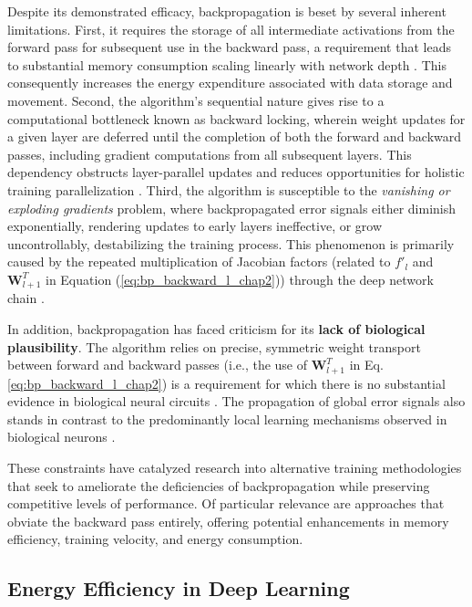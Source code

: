 Despite its demonstrated efficacy, backpropagation is beset by several inherent limitations. First, it requires the storage of all intermediate activations from the forward pass for subsequent use in the backward pass, a requirement that leads to substantial memory consumption scaling linearly with network depth \cite{chen2016training}. This consequently increases the energy expenditure associated with data storage and movement. Second, the algorithm's sequential nature gives rise to a computational bottleneck known as backward locking, wherein weight updates for a given layer are deferred until the completion of both the forward and backward passes, including gradient computations from all subsequent layers. This dependency obstructs layer-parallel updates and reduces opportunities for holistic training parallelization \cite{jaderberg2017decoupled}. Third, the algorithm is susceptible to the \emph{vanishing or exploding gradients} problem, where backpropagated error signals either diminish exponentially, rendering updates to early layers ineffective, or grow uncontrollably, destabilizing the training process. This phenomenon is primarily caused by the repeated multiplication of Jacobian factors (related to $f'_l$ and $\mathbf{W}_{l+1}^T$ in Equation (\ref{eq:bp_backward_l_chap2})) through the deep network chain \cite{hochreiter2001gradient}.

In addition, backpropagation has faced criticism for its \textbf{lack of biological plausibility}. The algorithm relies on precise, symmetric weight transport between forward and backward passes (i.e., the use of $\mathbf{W}_{l+1}^T$ in Eq. \ref{eq:bp_backward_l_chap2}) is a requirement for which there is no substantial evidence in biological neural circuits \cite{lillicrap2020backpropagation}. The propagation of global error signals also stands in contrast to the predominantly local learning mechanisms observed in biological neurons \cite{bengio2015towards}.

These constraints have catalyzed research into alternative training methodologies that seek to ameliorate the deficiencies of backpropagation while preserving competitive levels of performance. Of particular relevance are approaches that obviate the backward pass entirely, offering potential enhancements in memory efficiency, training velocity, and energy consumption.

\subsection{Energy Efficiency in Deep Learning}
\label{sec:energy_efficiency_chap2}

